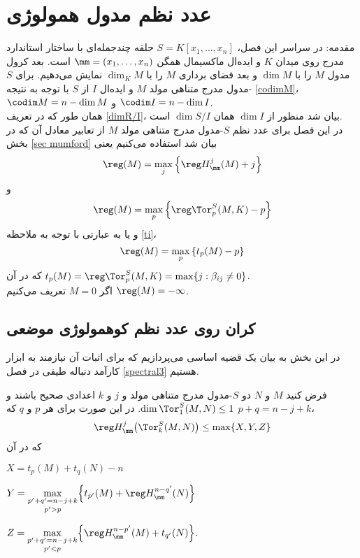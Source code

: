 \chapter{عدد نظم مدول همولوژی }\label{regularity-asli}

\thispagestyle{empty}
\newpage
{\large{مقدمه:}}
در سراسر این فصل، $S=K[x_1,\ldots,x_n]$ حلقه چندجمله‌ای‌ با ساختار استاندارد مدرج روی میدان $K$ و ایده‌ال ماکسیمال همگن ${\mm}=(x_1,\ldots,x_n)$ است. 
بعد کرول مدول $M$ را با $\dim M$ و بعد فضای برداری $M$ را با $\dim_KM$ نمایش می‌دهیم. برای $S$-مدول مدرج متناهی مولد $M$ و ایده‌ال $I$ از $S$ با توجه به نتیجه
\ref{codimM}،
$\codim M=n-\dim M$ 
و
$ \codim I=n-\dim I$.\\
همان طور که در تعریف \ref{dimR/I}،
بیان شد منظور از $\dim I$ همان $\dim S/I$ است. \\
در این فصل برای عدد نظم $S$-مدول مدرج متناهی مولد $M$ از تعابیر معادل آن که در بخش \ref{sec mumford}
بیان شد استفاده می‌کنیم یعنی
$$\reg(M)=\max_j\left\{\reg H^j_{\mm}(M)+j\right\}$$
و
$$\reg(M)=\max_p\left\{ \reg \Tor^S_p(M,K)-p\right\}$$
و یا به عبارتی با توجه به ملاحظه \ref{ti}،
$$\reg(M)=\max_p\left\{ t_p(M)-p\right\}$$
که در آن 
$t_p(M)=\reg\Tor^S_p(M,K)=\max\{j: \beta_{ij}\neq 0\}$.\\
اگر $M=0$ تعریف می‌کنیم $\reg(M)=-\infty$.
\section{{کران روی عدد نظم کوهمولوژی موضعی  }}
در این بخش به بیان  یک قضیه اساسی می‌پردازیم که برای اثبات آن نیازمند به ابزار کارآمد دنباله طیفی در فصل 
\ref{spectral3}
 هستیم.
\begin{theo}\label{reg-asli}
فرض کنید $M$ و $N$ دو $S$-مدول مدرج متناهی مولد و $j$ و $k$ اعدادی صحیح باشند و $\dim\Tor^S_1(M,N)\leq 1$. در این صورت برای هر $p$ و $q$ که
$p+q=n-j+k$،
$$\reg H^j_{\mm}\big(\Tor^S_k(M,N)\big)\leq \max\{X,Y,Z\}$$
که در آن 
\begin{flushleft}
$X=t_p(M)+t_q(N)-n$
\end{flushleft}
\begin{flushleft}
$Y=\underset{p'>p}{\underset{p'+q'=n-j+k}{\max}}\Big\{t_{p'}(M)+\reg H^{n-q'}_{\mm}(N)\Big\}$
\end{flushleft}
\begin{flushleft}
$Z=\underset{p'<p}{\underset{p'+q'=n-j+k}{\max}}\Big\{\reg H^{n-p'}_{\mm}(M)+t_{q'}(N)\Big\}.$
\end{flushleft}
\end{theo}



